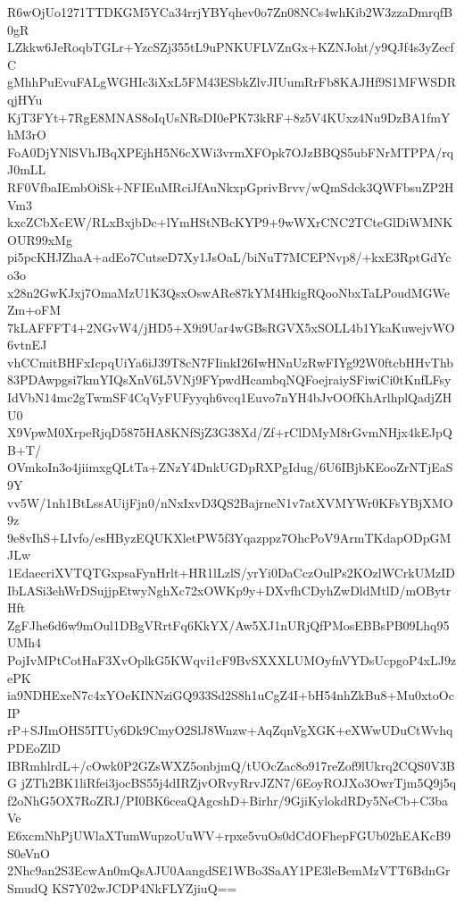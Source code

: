 R6wOjUo1271TTDKGM5YCa34rrjYBYqhev0o7Zn08NCs4whKib2W3zzaDmrqfB0gR
LZkkw6JeRoqbTGLr+YzcSZj355tL9uPNKUFLVZnGx+KZNJoht/y9QJf4s3yZecfC
gMhhPuEvuFALgWGHIc3iXxL5FM43ESbkZlvJIUumRrFb8KAJHf9S1MFWSDRqjHYu
KjT3FYt+7RgE8MNAS8oIqUsNRsDI0ePK73kRF+8z5V4KUxz4Nu9DzBA1fmYhM3rO
FoA0DjYNlSVhJBqXPEjhH5N6cXWi3vrmXFOpk7OJzBBQS5ubFNrMTPPA/rqJ0mLL
RF0VfbaIEmbOiSk+NFIEuMRciJfAuNkxpGprivBrvv/wQmSdck3QWFbsuZP2HVm3
kxcZCbXcEW/RLxBxjbDc+lYmHStNBcKYP9+9wWXrCNC2TCteGlDiWMNKOUR99xMg
pi5pcKHJZhaA+adEo7CutseD7Xy1JsOaL/biNuT7MCEPNvp8/+kxE3RptGdYco3o
x28n2GwKJxj7OmaMzU1K3QsxOswARe87kYM4HkigRQooNbxTaLPoudMGWeZm+oFM
7kLAFFFT4+2NGvW4/jHD5+X9i9Uar4wGBsRGVX5xSOLL4b1YkaKuwejvWO6vtnEJ
vhCCmitBHFxIcpqUiYa6iJ39T8cN7FIinkI26IwHNnUzRwFIYg92W0ftcbHHvThb
83PDAwpgsi7kmYIQsXnV6L5VNj9FYpwdHcambqNQFoejraiySFiwiCi0tKnfLFsy
IdVbN14mc2gTwmSF4CqVyFUFyyqh6vcq1Euvo7nYH4bJvOOfKhArlhplQadjZHU0
X9VpwM0XrpeRjqD5875HA8KNfSjZ3G38Xd/Zf+rClDMyM8rGvmNHjx4kEJpQB+T/
OVmkoIn3o4jiimxgQLtTa+ZNzY4DnkUGDpRXPgIdug/6U6IBjbKEooZrNTjEaS9Y
vv5W/1nh1BtLssAUijFjn0/nNxIxvD3QS2BajrneN1v7atXVMYWr0KFsYBjXMO9z
9e8vIhS+LIvfo/esHByzEQUKXletPW5f3Yqazppz7OhcPoV9ArmTKdapODpGMJLw
1EdaecriXVTQTGxpsaFynHrlt+HR1lLzlS/yrYi0DaCczOulPs2KOzlWCrkUMzID
IbLASi3ehWrDSujjpEtwyNghXc72xOWKp9y+DXvfhCDyhZwDldMtlD/mOBytrHft
ZgFJhe6d6w9mOul1DBgVRrtFq6KkYX/Aw5XJ1nURjQfPMosEBBsPB09Lhq95UMh4
PojIvMPtCotHaF3XvOplkG5KWqvi1cF9BvSXXXLUMOyfnVYDsUcpgoP4xLJ9zePK
ia9NDHExeN7c4xYOeKINNziGQ933Sd2S8h1uCgZ4I+bH54nhZkBu8+Mu0xtoOcIP
rP+SJImOHS5ITUy6Dk9CmyO2SlJ8Wnzw+AqZqnVgXGK+eXWwUDuCtWvhqPDEoZlD
IBRmhlrdL+/cOwk0P2GZsWXZ5onbjmQ/tUOcZac8o917reZof9lUkrq2CQS0V3BG
jZTh2BK1liRfei3jocBS55j4dIRZjvORvyRrvJZN7/6EoyROJXo3OwrTjm5Q9j5q
f2oNhG5OX7RoZRJ/PI0BK6ceaQAgcshD+Birhr/9GjiKylokdRDy5NeCb+C3baVe
E6xcmNhPjUWlaXTumWupzoUuWV+rpxe5vuOs0dCdOFhepFGUb02hEAKcB9S0eVnO
2Nhc9an2S3EcwAn0mQsAJU0AangdSE1WBo3SaAY1PE3leBemMzVTT6BdnGrSmudQ
KS7Y02wJCDP4NkFLYZjiuQ==
